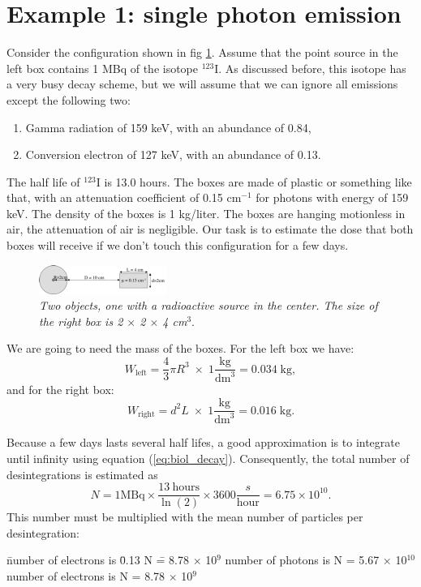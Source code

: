 \section{Example 1: single photon emission}
Consider the configuration shown in fig \ref{fig:biol-singlephoton}.
Assume that the point source in the left box contains 1 MBq of the
isotope $^{123}$I. As discussed before, this isotope has a very
busy decay scheme, but we will assume that we can ignore all emissions
except the following two:
\begin{enumerate}
  \item Gamma radiation of 159 keV, with an abundance of 0.84,
  \item Conversion electron of 127 keV, with an abundance of 0.13.
\end{enumerate}
The half life of $^{123}$I is 13.0 hours.
The boxes are made of plastic or something like that, with an
attenuation coefficient of 0.15 cm$^{-1}$ for photons with energy
of 159 keV. The density of the boxes is 1 kg/liter.
The boxes are hanging motionless in air, the attenuation
of air is negligible. Our task is to estimate the dose that both boxes
will receive if we don't touch this configuration for a few days.
%
%
\begin{figure}[tb]
\centering
\includegraphics[width=\figmedium]{figs/fig_biol_singlephoton.pdf}
\caption{\label{fig:biol-singlephoton} \emph{Two objects, one with a
radioactive source in the center. The size of the right box is
2 $\times$ 2 $\times$ 4 cm$^3$}.}
\end{figure}

We are going to need the mass of the boxes. For the left box we
have:
\begin{equation}
  W_{\mbox{left}} = \frac{4}{3} \pi R^3 \; \times \; 1 \frac{\mbox{kg}}{\mbox{dm}^3}
      = 0.034 \;\mbox{kg},
\end{equation}
and for the right box:
\begin{equation}
  W_{\mbox{right}} = d^2 L\; \times \; 1 \frac{\mbox{kg}}{\mbox{dm}^3}
      = 0.016 \;\mbox{kg}.
\end{equation}

Because a few days lasts several half lifes, a good approximation is
to integrate until infinity using equation (\ref{eq:biol_decay}).
Consequently, the total number of desintegrations is estimated as
\begin{equation}
  N = 1 \mbox{MBq} \times \frac{13\ \mbox{hours}}{\ln(2)} 
    \times 3600 \frac{s}{\mbox{hour}}
    = 6.75 \times 10^{10}.
\end{equation}
This number must be multiplied with the mean number of particles per
desintegration:
\begin{tabbing}
  \hspace{4mm} \= number of electrons is \= 0.13 N \= = 8.78 $\times$ 10$^{9}$ \kill
               \> number of photons is  N \> = 5.67 $\times$ 10$^{10}$\\
               \> number of electrons is    N \> = 8.78 $\times$ 10$^9$
\end{tabbing}

